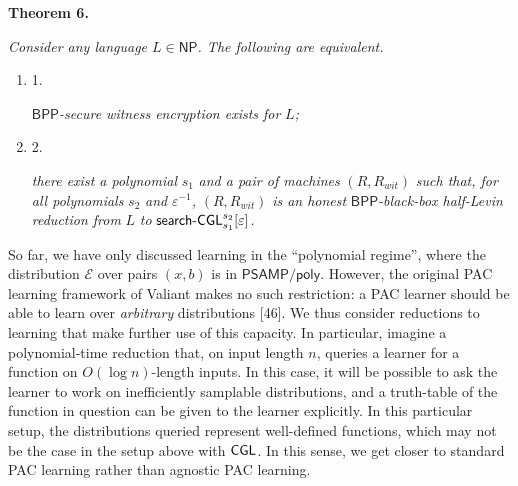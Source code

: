 \documentclass[10pt,a4paper]{article}
\begin{document}


\par\medskip\noindent\textbf{
\textbf{Theorem 6}\textbf{.}
}\par



\emph{Consider any language $L\in{\mathsf{NP}}$. The following are equivalent.}\par


\begin{enumerate}


\item[] 
1. 


${\mathsf{BPP}}$\emph{-secure witness encryption exists for }$L$\emph{;}\par





\item[] 
2. 


\emph{there exist a polynomial }$s_{1}$\emph{ and a pair of machines }$(R,R_{wit})$\emph{ such that, for all polynomials }$s_{2}$\emph{ and }$\varepsilon^{-1}$\emph{, }$(R,R_{wit})$\emph{ is an honest }${\mathsf{BPP}}$\emph{-black-box half-Levin reduction from }$L$\emph{ to }${\sf search}\text{-}{\sf CGL}^{s_{2}}_{s_{1}}[\varepsilon]$\emph{.}\par





\end{enumerate}






So far, we have only discussed learning in the “polynomial regime”, where the distribution $\mathcal{E}$ over pairs $(x,b)$ is in ${\mathsf{P}}{\mathsf{SAMP}}/{\mathsf{poly}}$. However, the original PAC learning framework of Valiant makes no such restriction: a PAC learner should be able to learn over \emph{arbitrary} distributions [46]. We thus consider reductions to learning that make further use of this capacity. In particular, imagine a polynomial-time reduction that, on input length $n$, queries a learner for a function on $O(\log n)$-length inputs. In this case, it will be possible to ask the learner to work on inefficiently samplable distributions, and a truth-table of the function in question can be given to the learner explicitly. In this particular setup, the distributions queried represent well-defined functions, which may not be the case in the setup above with ${\sf CGL}$. In this sense, we get closer to standard PAC learning rather than agnostic PAC learning.\par
\end{document}
